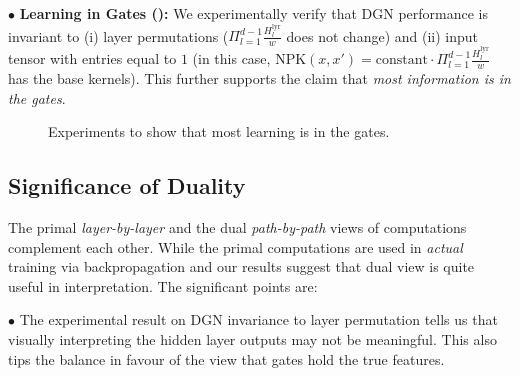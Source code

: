 $\bullet$ \textbf{Learning in Gates ():} We experimentally verify that DGN performance is invariant to (i) layer permutations ($\Pi_{l=1}^{d-1} \frac{H^{\text{lyr}}_l}{w}$ does not change) and (ii) input tensor with entries equal to $1$ (in this case, NPK$(x,x')= \text{constant}\cdot \Pi_{l=1}^{d-1} \frac{H^{\text{lyr}}_l}{w}$ has the base kernels). This further supports the claim that \emph{most information is in the gates}. %
\FloatBarrier
\begin{figure}[h]
\centering
{}
\caption{ Experiments to show that most learning is in the gates.}
\label{fig:permute}
\end{figure}
\subsection{Significance of Duality}
The primal \emph{layer-by-layer} and the dual \emph{path-by-path} views of computations complement each other. While the primal computations are used in \emph{actual} training via backpropagation and our results suggest that dual view is quite useful in interpretation. The significant points are:

$\bullet$ The experimental result on DGN invariance to layer permutation tells us that visually interpreting the hidden layer outputs may not be meaningful. This also tips the balance in favour of the view that gates hold the true features.

